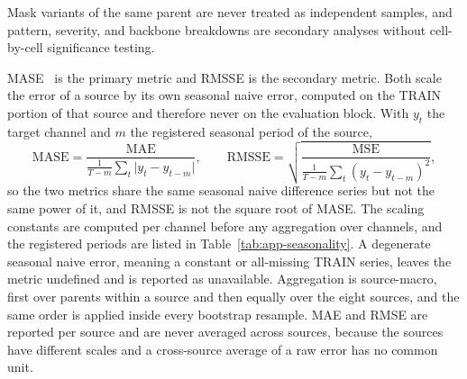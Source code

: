 \documentclass{article}
\begin{document}
Mask variants of the same parent are never
treated as independent samples, and pattern, severity, and backbone breakdowns are secondary
analyses without cell-by-cell significance testing.

MASE~\citep{hyndman2006mase} is the primary metric and RMSSE is the secondary metric. Both
scale the error of a source by its own seasonal naive error, computed on the TRAIN portion of
that source and therefore never on the evaluation block. With $y_t$ the target channel and $m$
the registered seasonal period of the source,
\begin{equation}
  \mathrm{MASE} = \frac{\mathrm{MAE}}{\frac{1}{T-m}\sum_{t} \lvert y_t - y_{t-m} \rvert},
  \qquad
  \mathrm{RMSSE} = \sqrt{\frac{\mathrm{MSE}}{\frac{1}{T-m}\sum_{t} (y_t - y_{t-m})^2}},
  \label{eq:metrics}
\end{equation}
so the two metrics share the same seasonal naive difference series but not the same power of
it, and RMSSE is not the square root of MASE. The scaling constants are computed per channel
before any aggregation over channels, and the registered periods are listed in
Table~\ref{tab:app-seasonality}. A degenerate seasonal naive error, meaning a constant or
all-missing TRAIN series, leaves the metric undefined and is reported as unavailable. Aggregation is source-macro, first over parents within a source and then equally over
the eight sources, and the same order is applied inside every bootstrap resample. MAE and RMSE
are reported per source and are never averaged across sources, because the sources have
different scales and a cross-source average of a raw error has no common unit.

\begin{table}[htbp]
  \caption{Per-source seasonal periods and context conventions used by the metric
  denominators. Context length is $L = 512$ for every source. The seasonal period is the
  sampling-frequency period registered before any run, not a tuned quantity.}
  \label{tab:app-seasonality}
  \centering
  \small
  \setlength{\tabcolsep}{4pt}
\end{table}
\end{document}
